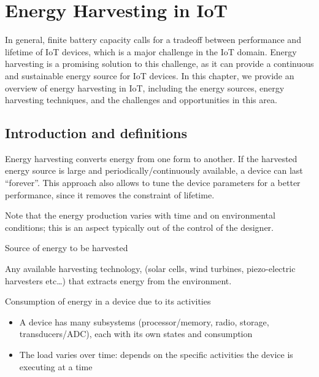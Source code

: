 \chapter{Energy Harvesting in IoT}
In general, finite battery capacity calls for a tradeoff between performance and lifetime of IoT devices, which is a major challenge in the IoT domain. Energy harvesting is a promising solution to this challenge, as it can provide a continuous and sustainable energy source for IoT devices. In this chapter, we provide an overview of energy harvesting in IoT, including the energy sources, energy harvesting techniques, and the challenges and opportunities in this area.

\section{Introduction and definitions}
Energy harvesting converts energy from one form to another.
If the harvested energy source
is large and periodically/continuously available, a device can last ``forever''.
This approach also allows to tune the device parameters for a better performance, since it removes the constraint of lifetime.

Note that the energy production varies with time and on environmental conditions; 
this is an aspect typically out of the control of the designer.

\begin{definition}
   Source of energy to be harvested
\end{definition}

\begin{definition}
   Any available harvesting technology, (solar cells, wind turbines, piezo-electric harvesters etc\dots) that extracts energy from the environment.
\end{definition}

\begin{definition}
   [Load]
   Consumption of energy in a device due to its activities
   \begin{itemize}
      \item A device has many subsystems
      (processor/memory, radio, storage,
      transducers/ADC), each with its own states and
      consumption
      \item The load varies over time:
      depends on the specific activities the device is
      executing at a time
   \end{itemize}
\end{definition}

